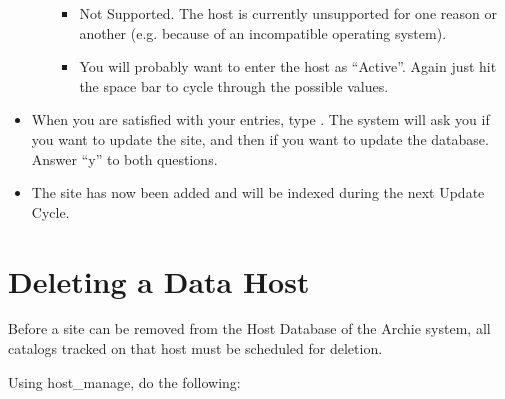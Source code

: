 \begin{itemize}
\begin{itemize}
\begin{itemize}
\item Not Supported. The host is currently unsupported for one reason or
another (e.g. because of an incompatible operating system).

\item You will probably want to enter the host as ``Active''. Again just hit the
space bar to cycle through the possible values.
\end{itemize}

\end{itemize}

\item When you are satisfied with your entries, type . The
system will ask you if you want to update the site, and then if you want to update
the database. Answer ``y'' to both questions.

\item The site has now been added and will be indexed during the next Update 
Cycle.
\end{itemize}

\section{Deleting a Data Host}
\label{sec:delhost}

Before a site can be removed from the Host Database of the Archie system, all
catalogs tracked on that host must be scheduled for deletion.

Using host\_manage, do the following:

